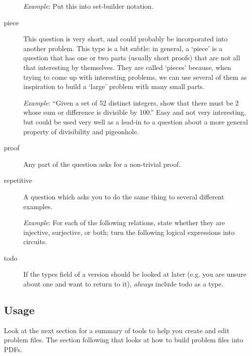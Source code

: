 \begin{description}
      \textit{Example}: Put this into set-builder notation.
      \item[piece] This question is very short, and could probably be incorporated into another problem. This type is a bit subtle: in general, a `piece' is a question that has one or two parts (usually short proofs) that are not all that interesting by themselves. They are called `pieces' because, when trying to come up with interesting problems, we can use several of them as inspiration to build a `large' problem with many small parts.
      
      \textit{Example}: ``Given a set of 52 distinct integers, show that there must be 2 whose sum or difference is divisible by 100.'' Easy and not very interesting, but could be used very well as a lead-in to a question about a more general property of divisibility and pigeonhole.
      \item[proof] Any part of the question asks for a non-trivial proof. 
      \item[repetitive] A question which asks you to do the same thing to several different examples.
      
      \textit{Example}: For each of the following relations, state whether they are injective, surjective, or both; turn the following logical expressions into circuits.
      \item[todo] If the types field of a version should be looked at later (e.g. you are unsure about one and want to return to it), \textit{always} include todo as a type.
    \end{description}
    
  \subsection{Usage}
    Look at the next section for a summary of tools to help you create and edit problem files. The section following that looks at how to build problem files into PDFs.